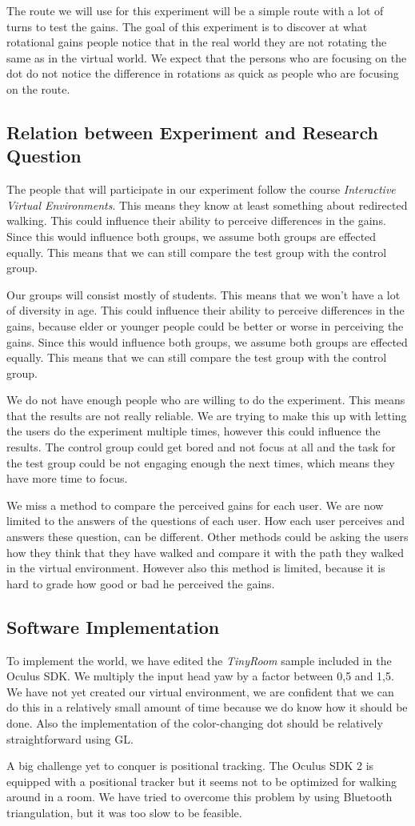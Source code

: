 The route we will use for this experiment will be a simple route with a lot of turns to test the gains. 
The goal of this experiment is to discover at what rotational gains people notice that in the real world they are not rotating the same as in the virtual world. 
We expect that the persons who are focusing on the dot do not notice the difference in rotations as quick as people who are focusing on the route. 

\subsection{Relation between Experiment and Research Question}\label{sec:rel}
The people that will participate in our experiment follow the course \emph{Interactive Virtual Environments}.
This means they know at least something about redirected walking.
This could influence their ability to perceive differences in the gains.
Since this would influence both groups, we assume both groups are effected equally.
This means that we can still compare the test group with the control group.

Our groups will consist mostly of students.
This means that we won't have a lot of diversity in age.
This could influence their ability to perceive differences in the gains, because elder or younger people could be better or worse in perceiving the gains.
Since this would influence both groups, we assume both groups are effected equally.
This means that we can still compare the test group with the control group.

We do not have enough people who are willing to do the experiment.
This means that the results are not really reliable.
We are trying to make this up with letting the  users do the experiment multiple times,  however this could influence the results.
The control group could get bored and not focus at all and the task for the test group could be not engaging enough the next times, which means they have more time to focus.

We miss a method to compare the perceived gains for each user.
We are now limited to the answers of the questions of each user.
How each user perceives and answers these question, can be different.
Other methods could be asking the users how they think that they have walked and compare it with the path they walked in the virtual environment.
However also this method is limited, because it is hard to grade how good or bad he perceived the gains.

\subsection{Software Implementation}
To implement the world, we have edited the \textit{TinyRoom} sample included in the Oculus SDK. 
We multiply the input head yaw by a factor between 0,5 and 1,5.
We have not yet created our virtual environment, we are confident that we can do this in a relatively small amount of time because we do know how it should be done.
Also the implementation of the color-changing dot should be relatively straightforward using GL.

A big challenge yet to conquer is positional tracking.
The Oculus SDK 2 is equipped with a positional tracker but it seems not to be optimized for walking around in a room.
We have tried to overcome this problem by using Bluetooth triangulation, but it was too slow to be feasible.